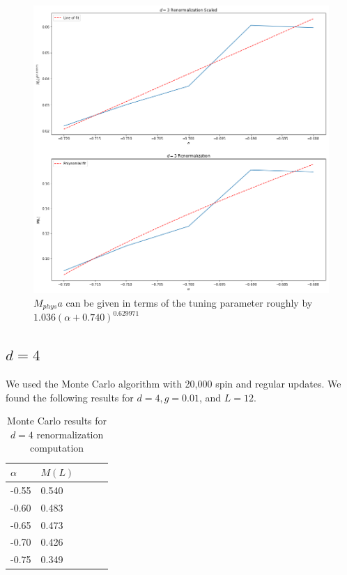 \documentclass[12]{report}
\newcommand\0{\mathbf{0}}
\newcommand\<{\langle}
\renewcommand\>{\rangle}
\begin{document}
\begin{figure}[H]
\centering
\includegraphics[width=\textwidth]{renormalization_3}
\caption{$M_{phys}a$ can be given in terms of the tuning parameter roughly by $1.036(\alpha + 0.740)^{0.629971}$}		
\end{figure}

\subsection{$d=4$}

We used the Monte Carlo algorithm with 20,000 spin and regular updates. We found the following results for $d=4, g = 0.01$, and $L = 12$.

\begin{table}[H]
\centering
\begin{tabular}{|l|l|l|l|l|}
\hline
$\alpha$ & $M(L)$ \\ \hline
-0.55   & 0.540 \\
-0.60 & 0.483 \\
-0.65   & 0.473 \\ 
-0.70 & 0.426\\
-0.75 & 0.349 \\ \hline
\end{tabular}
\caption{Monte Carlo results for $d=4$ renormalization computation}
\end{table}
\end{document}
